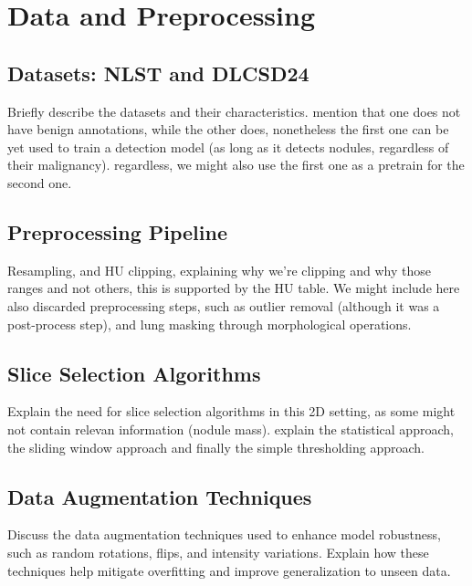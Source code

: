 \chapter{Data and Preprocessing}
\section{Datasets: NLST and DLCSD24}
Briefly describe the datasets and their characteristics. mention that one does not have benign annotations, while the other does, nonetheless the first one can be yet used to train a detection model (as long as it detects nodules, regardless of their malignancy). regardless, we might also use the first one as a pretrain for the second one.

\section{Preprocessing Pipeline}
Resampling, and HU clipping, explaining why we're clipping and why those ranges and not others, this is supported by the HU table.
We might include here also discarded preprocessing steps, such as outlier removal (although it was a post-process step), and lung masking through morphological operations.

\section{Slice Selection Algorithms}
Explain the need for slice selection algorithms in this 2D setting, as some might not contain relevan information (nodule mass). explain the statistical approach, the sliding window approach and finally the simple thresholding approach.

\section{Data Augmentation Techniques}
Discuss the data augmentation techniques used to enhance model robustness, such as random rotations, flips, and intensity variations. Explain how these techniques help mitigate overfitting and improve generalization to unseen data.